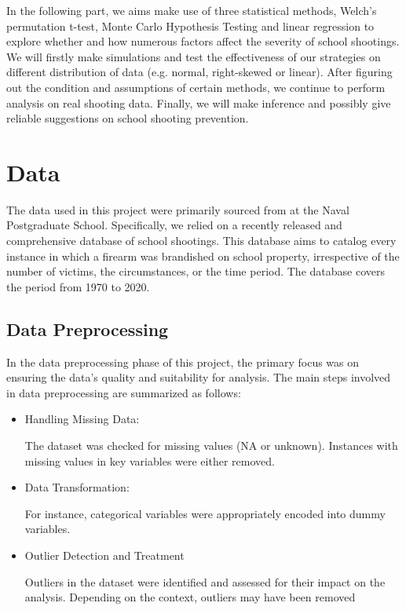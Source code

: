 \documentclass[12pt]{article}
\numberwithin{figure}{section}
\begin{document}
In the following part, we aims make use of three statistical methods, Welch’s permutation t-test, Monte Carlo Hypothesis Testing and linear regression to explore whether and how numerous factors affect the severity of school shootings. We will firstly make simulations and test the effectiveness of our strategies on different distribution of data (e.g. normal, right-skewed or linear). After figuring out the condition and assumptions of certain methods, we continue to perform analysis on real shooting data. Finally, we will make inference and possibly give reliable suggestions on school shooting prevention.

\section{Data}

The data used in this project were primarily sourced from \textcite{database} at the Naval Postgraduate School. Specifically, we relied on a recently released and comprehensive database of school shootings. This database aims to catalog every instance in which a firearm was brandished on school property, irrespective of the number of victims, the circumstances, or the time period. The database covers the period from 1970 to 2020.

\subsection{Data Preprocessing}

In the data preprocessing phase of this project, the primary focus was on ensuring the data's quality and suitability for analysis. The main steps involved in data preprocessing are summarized as follows:

\begin{itemize}
    \item Handling Missing Data:

    The dataset was checked for missing values (NA or unknown). Instances with missing values in key variables were either removed.

    \item Data Transformation:

    For instance, categorical variables were appropriately encoded into dummy variables.

    \item Outlier Detection and Treatment

    Outliers in the dataset were identified and assessed for their impact on the analysis. Depending on the context, outliers may have been removed
    
\end{itemize}
\end{document}
